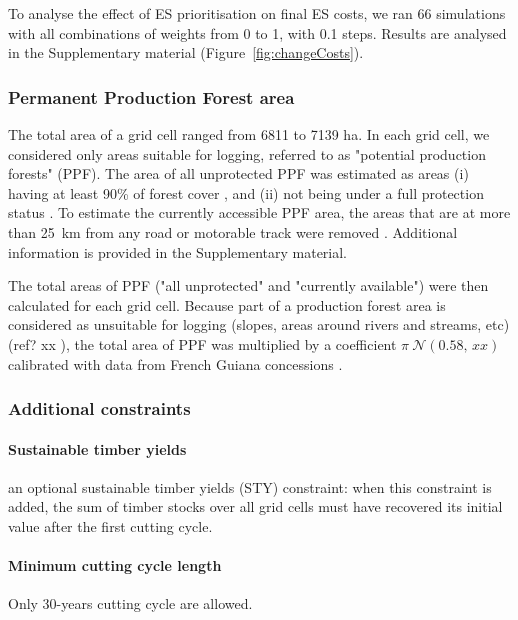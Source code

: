 \documentclass{article}
\begin{document}
To analyse the effect of ES prioritisation on final ES costs, we ran 66 simulations with all combinations of weights from 0 to 1, with 0.1 steps. Results are analysed in the Supplementary material (Figure~\ref{fig:changeCosts}).  

\subsubsection{Permanent Production Forest area}

The total area of a grid cell ranged from 6811 to 7139 ha. In each grid cell, we considered only areas suitable for logging, referred to as "potential production forests" (PPF). The area of all unprotected PPF was estimated as areas (i) having at least 90\% of forest cover \cite{Hansen2013}, and (ii) not being under a full protection status \cite{WDPA2016}. To estimate the currently accessible PPF area, the areas that are at more than 25~km from any road or motorable track were removed \cite{OSM2018}. Additional information is provided in the Supplementary material. 

The total areas of PPF ("all unprotected" and "currently available") were then calculated for each grid cell. Because part of a production forest area is considered as unsuitable for logging (slopes, areas around rivers and streams, etc) (ref? xx ), the total area of PPF was multiplied by a coefficient $\pi ~ \mathcal{N}(0.58 \text{, } xx) $ calibrated with data from French Guiana concessions \cite{Piponiotc}. 

\subsubsection{Additional constraints}

\paragraph{Sustainable timber yields}

an optional sustainable timber yields (STY) constraint: when this constraint is added, the sum of timber stocks over all grid cells must have recovered its initial value after the first cutting cycle. 

\paragraph{Minimum cutting cycle length}

Only 30-years cutting cycle are allowed. 
\end{document}
